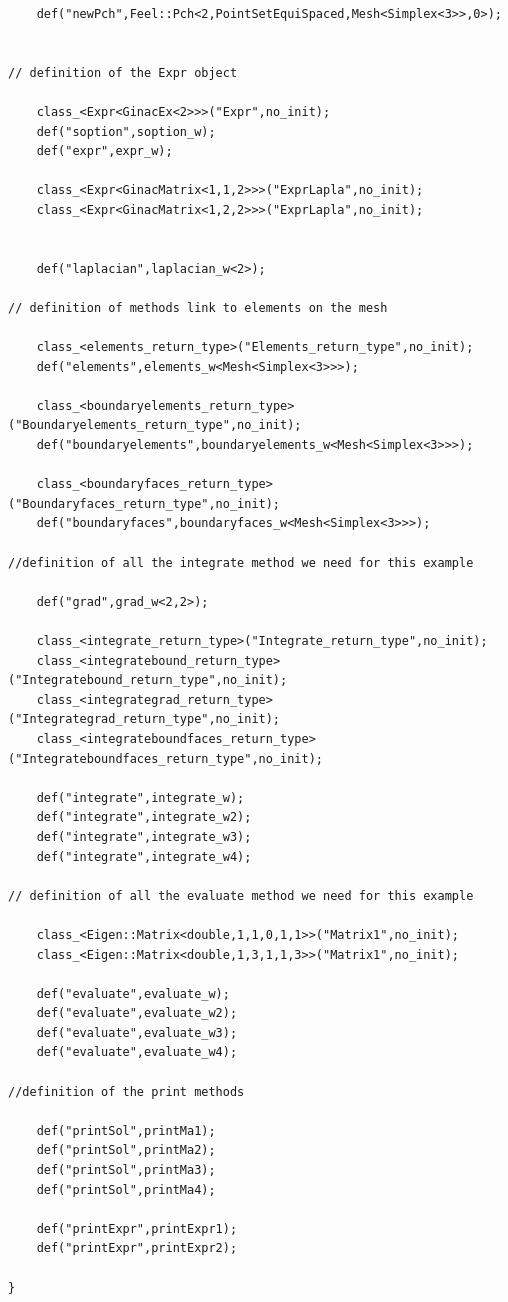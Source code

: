 \documentclass[french,12pt]{article}
\begin{document}
\begin{lstlisting}
    def("newPch",Feel::Pch<2,PointSetEquiSpaced,Mesh<Simplex<3>>,0>); 


// definition of the Expr object 

    class_<Expr<GinacEx<2>>>("Expr",no_init);
    def("soption",soption_w);
    def("expr",expr_w);

    class_<Expr<GinacMatrix<1,1,2>>>("ExprLapla",no_init);
    class_<Expr<GinacMatrix<1,2,2>>>("ExprLapla",no_init);


    def("laplacian",laplacian_w<2>);

// definition of methods link to elements on the mesh 

    class_<elements_return_type>("Elements_return_type",no_init);
    def("elements",elements_w<Mesh<Simplex<3>>>);

    class_<boundaryelements_return_type>("Boundaryelements_return_type",no_init);
    def("boundaryelements",boundaryelements_w<Mesh<Simplex<3>>>);

    class_<boundaryfaces_return_type>("Boundaryfaces_return_type",no_init);
    def("boundaryfaces",boundaryfaces_w<Mesh<Simplex<3>>>);

//definition of all the integrate method we need for this example
    
    def("grad",grad_w<2,2>);

    class_<integrate_return_type>("Integrate_return_type",no_init);
    class_<integratebound_return_type>("Integratebound_return_type",no_init);
    class_<integrategrad_return_type>("Integrategrad_return_type",no_init);
    class_<integrateboundfaces_return_type>("Integrateboundfaces_return_type",no_init);

    def("integrate",integrate_w);
    def("integrate",integrate_w2);
    def("integrate",integrate_w3);
    def("integrate",integrate_w4);

// definition of all the evaluate method we need for this example

    class_<Eigen::Matrix<double,1,1,0,1,1>>("Matrix1",no_init);
    class_<Eigen::Matrix<double,1,3,1,1,3>>("Matrix1",no_init);

    def("evaluate",evaluate_w);
    def("evaluate",evaluate_w2);
    def("evaluate",evaluate_w3);
    def("evaluate",evaluate_w4);

//definition of the print methods 

    def("printSol",printMa1);
    def("printSol",printMa2);
    def("printSol",printMa3);
    def("printSol",printMa4);

    def("printExpr",printExpr1);
    def("printExpr",printExpr2);

}
\end{lstlisting}
\end{document}
